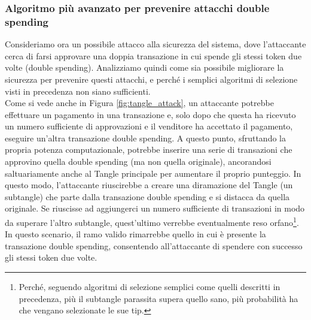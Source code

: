 \documentclass[12pt,a4paper,openright,twoside]{report}
\begin{document}
\subsubsection{Algoritmo più avanzato per prevenire attacchi double spending}
\label{doublespending}
Consideriamo ora un possibile attacco alla sicurezza del sistema, dove l'attaccante cerca di farsi approvare una doppia transazione in cui spende gli stessi token due volte (double spending). Analizziamo quindi come sia possibile migliorare la sicurezza per prevenire questi attacchi, e perché i semplici algoritmi di selezione visti in precedenza non siano sufficienti.\\
Come si vede anche in Figura \ref{fig:tangle_attack}, un attaccante potrebbe effettuare un pagamento in una transazione e, solo dopo che questa ha ricevuto un numero sufficiente di approvazioni e il venditore ha accettato il pagamento, eseguire un'altra transazione double spending. A questo punto, sfruttando la propria potenza computazionale, potrebbe inserire una serie di transazioni che approvino quella double spending (ma non quella originale), ancorandosi saltuariamente anche al Tangle principale per aumentare il proprio punteggio. In questo modo, l'attaccante riuscirebbe a creare una diramazione del Tangle (un subtangle) che parte dalla transazione double spending e si distacca da quella originale. Se riuscisse ad aggiungerci un numero sufficiente di transazioni in modo da superare l'altro subtangle, quest'ultimo verrebbe eventualmente reso orfano\footnote{Perché, seguendo algoritmi di selezione semplici come quelli descritti in precedenza, più il subtangle parassita supera quello sano, più probabilità ha che vengano selezionate le sue tip.}. In questo scenario, il ramo valido rimarrebbe quello in cui è presente la transazione double spending, consentendo all'attaccante di spendere con successo gli stessi token due volte.
\end{document}

